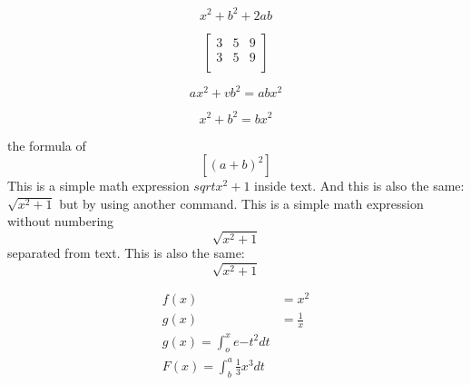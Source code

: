 \documentclass{article}
\begin{document}
	\[x^2+b^2+2ab\]
	
	\[
	\begin{bmatrix}
		3 & 5 & 9\\
		3 & 5 & 9\\
	\end{bmatrix}
    \]
    
    \begin{equation}
    	ax^2+vb^2=abx^2
    \end{equation}
    
    \begin{equation}
    	x^2+b^2=bx^2
    \end{equation}
    
    the formula of 
    \[[(a+b)^2]\]
    This is a simple math expression  \(sqrt{x^2+1}\)
    inside text.
    And this is also the same:
    \begin{math}
    	\sqrt{x^2+1}
    \end{math}
    but by using another command.
    This is a simple math expression without numbering 
    \[\sqrt{x^2+1}\]
    separated from text.
    This is also the same:
    \begin{displaymath}
    	\sqrt{x^2+1}
    \end{displaymath}
    
    
    \begin{align}
    	f(x) &= x^2\\
    	g(x) &=\frac{1}{x}\\
    	g(x) = \int_{o}^{x} e{-t^2} dt\\
    	F(x) =\int^a_b\frac{1}{3}x^3 dt
    \end{align}
    
    
\end{document}
